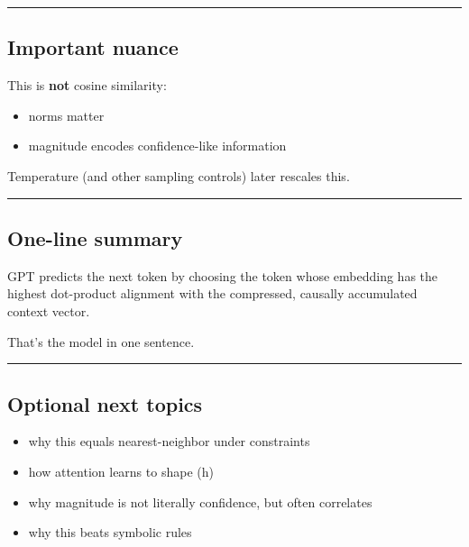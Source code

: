 \documentclass[
]{article}
\providecommand{\tightlist}{%
  \setlength{\itemsep}{0pt}\setlength{\parskip}{0pt}}
\begin{document}
\begin{center}\rule{0.5\linewidth}{0.5pt}\end{center}

\hypertarget{important-nuance}{%
\subsection{Important nuance}\label{important-nuance}}

This is \textbf{not} cosine similarity:

\begin{itemize}
\tightlist
\item
  norms matter
\item
  magnitude encodes confidence-like information
\end{itemize}

Temperature (and other sampling controls) later rescales this.

\begin{center}\rule{0.5\linewidth}{0.5pt}\end{center}

\hypertarget{one-line-summary}{%
\subsection{One-line summary}\label{one-line-summary}}

GPT predicts the next token by choosing the token whose embedding has
the highest dot-product alignment with the compressed, causally
accumulated context vector.

That's the model in one sentence.

\begin{center}\rule{0.5\linewidth}{0.5pt}\end{center}

\hypertarget{optional-next-topics}{%
\subsection{Optional next topics}\label{optional-next-topics}}

\begin{itemize}
\tightlist
\item
  why this equals nearest-neighbor under constraints
\item
  how attention learns to shape (h)
\item
  why magnitude is not literally confidence, but often correlates
\item
  why this beats symbolic rules
\end{itemize}
\end{document}
